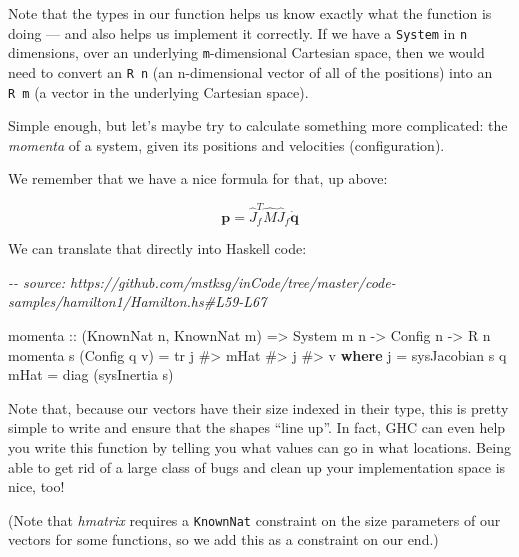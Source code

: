 \documentclass[]{article}
\newenvironment{Shaded}{}{}
\newcommand{\CommentTok}[1]{\textcolor[rgb]{0.38,0.63,0.69}{\textit{#1}}}
\newcommand{\DataTypeTok}[1]{\textcolor[rgb]{0.56,0.13,0.00}{#1}}
\newcommand{\KeywordTok}[1]{\textcolor[rgb]{0.00,0.44,0.13}{\textbf{#1}}}
\newcommand{\NormalTok}[1]{#1}
\newcommand{\OperatorTok}[1]{\textcolor[rgb]{0.40,0.40,0.40}{#1}}
\newcommand{\OtherTok}[1]{\textcolor[rgb]{0.00,0.44,0.13}{#1}}
\begin{document}
Note that the types in our function helps us know exactly what the function is
doing --- and also helps us implement it correctly. If we have a \texttt{System}
in \texttt{n} dimensions, over an underlying \texttt{m}-dimensional Cartesian
space, then we would need to convert an \texttt{R\ n} (an n-dimensional vector
of all of the positions) into an \texttt{R\ m} (a vector in the underlying
Cartesian space).

Simple enough, but let's maybe try to calculate something more complicated: the
\emph{momenta} of a system, given its positions and velocities (configuration).

We remember that we have a nice formula for that, up above:

\[
\mathbf{p} = \hat{J}_f^T \hat{M} \hat{J}_f \dot{\mathbf{q}}
\]

We can translate that directly into Haskell code:

\begin{Shaded}
\begin{Highlighting}[]
\CommentTok{{-}{-} source: https://github.com/mstksg/inCode/tree/master/code{-}samples/hamilton1/Hamilton.hs\#L59{-}L67}

\NormalTok{momenta}
\OtherTok{    ::}\NormalTok{ (}\DataTypeTok{KnownNat}\NormalTok{ n, }\DataTypeTok{KnownNat}\NormalTok{ m)}
    \OtherTok{=>} \DataTypeTok{System}\NormalTok{ m n}
    \OtherTok{{-}>} \DataTypeTok{Config}\NormalTok{ n}
    \OtherTok{{-}>} \DataTypeTok{R}\NormalTok{ n}
\NormalTok{momenta s (}\DataTypeTok{Config}\NormalTok{ q v) }\OtherTok{=}\NormalTok{ tr j }\OperatorTok{\#>}\NormalTok{ mHat }\OperatorTok{\#>}\NormalTok{ j }\OperatorTok{\#>}\NormalTok{ v}
  \KeywordTok{where}
\NormalTok{    j    }\OtherTok{=}\NormalTok{ sysJacobian s q}
\NormalTok{    mHat }\OtherTok{=}\NormalTok{ diag (sysInertia s)}
\end{Highlighting}
\end{Shaded}

Note that, because our vectors have their size indexed in their type, this is
pretty simple to write and ensure that the shapes ``line up''. In fact, GHC can
even help you write this function by telling you what values can go in what
locations. Being able to get rid of a large class of bugs and clean up your
implementation space is nice, too!

(Note that \emph{hmatrix} requires a \texttt{KnownNat} constraint on the size
parameters of our vectors for some functions, so we add this as a constraint on
our end.)
\end{document}
